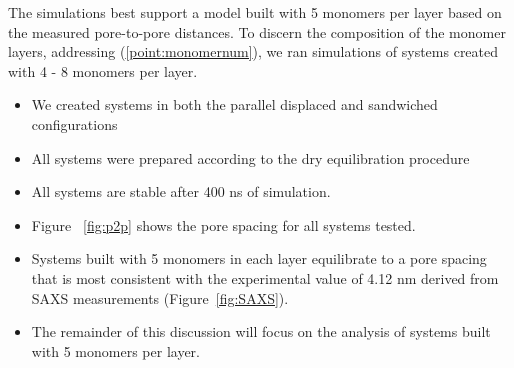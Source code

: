 \documentclass{article}
\begin{document}

  The simulations best support a model built with 5 monomers per layer based on 
  the measured pore-to-pore distances. To discern the composition of the monomer 
  layers, addressing (\ref{point:monomernum}), we ran simulations of systems created
  with 4 - 8 monomers per layer.  %
  \begin{itemize}
        \item We created systems in both the parallel displaced and sandwiched configurations
	\item All systems were prepared according to the dry equilibration procedure
        \item All systems are stable after 400 ns of simulation.  
        \item Figure ~\ref{fig:p2p} shows the pore spacing for all systems tested.
        \item Systems built with 5 monomers in each layer equilibrate to a pore spacing
        that is most consistent with the experimental value of 4.12 nm derived from
        SAXS measurements (Figure~\ref{fig:SAXS}).
        \item The remainder of this discussion will focus on the analysis of systems
        built with 5 monomers per layer.
  \end{itemize}
\end{document}

